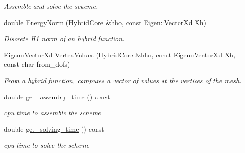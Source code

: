 \begin{DoxyCompactItemize}
\begin{DoxyCompactList}\small\item\em Assemble and solve the scheme. \end{DoxyCompactList}\item 
\mbox{\label{classHArDCore2D_1_1HHO__Diffusion_a1f21d17ee818df40d6c0081300c44982}} 
double \hyperlink{classHArDCore2D_1_1HHO__Diffusion_a1f21d17ee818df40d6c0081300c44982}{Energy\+Norm} (\hyperlink{classHArDCore2D_1_1HybridCore}{Hybrid\+Core} \&hho, const Eigen\+::\+Vector\+Xd Xh)
\begin{DoxyCompactList}\small\item\em Discrete H1 norm of an hybrid function. \end{DoxyCompactList}\item 
Eigen\+::\+Vector\+Xd \hyperlink{classHArDCore2D_1_1HHO__Diffusion_a2b77651b50be012339ca136f4fd90e81}{Vertex\+Values} (\hyperlink{classHArDCore2D_1_1HybridCore}{Hybrid\+Core} \&hho, const Eigen\+::\+Vector\+Xd Xh, const char from\+\_\+dofs)
\begin{DoxyCompactList}\small\item\em From a hybrid function, computes a vector of values at the vertices of the mesh. \end{DoxyCompactList}\item 
\mbox{\label{classHArDCore2D_1_1HHO__Diffusion_a4b67f061d06b1aea5a626792a2bddd1e}} 
double \hyperlink{classHArDCore2D_1_1HHO__Diffusion_a4b67f061d06b1aea5a626792a2bddd1e}{get\+\_\+assembly\+\_\+time} () const
\begin{DoxyCompactList}\small\item\em cpu time to assemble the scheme \end{DoxyCompactList}\item 
\mbox{\label{classHArDCore2D_1_1HHO__Diffusion_a0ba01c42bc116f962b6982b27e95b471}} 
double \hyperlink{classHArDCore2D_1_1HHO__Diffusion_a0ba01c42bc116f962b6982b27e95b471}{get\+\_\+solving\+\_\+time} () const
\begin{DoxyCompactList}\small\item\em cpu time to solve the scheme \end{DoxyCompactList}\item 
\mbox{\label{classHArDCore2D_1_1HHO__Diffusion_ad53ffa4a52af7bf6803e28f36c7e3365}} 

\end{DoxyCompactItemize}
